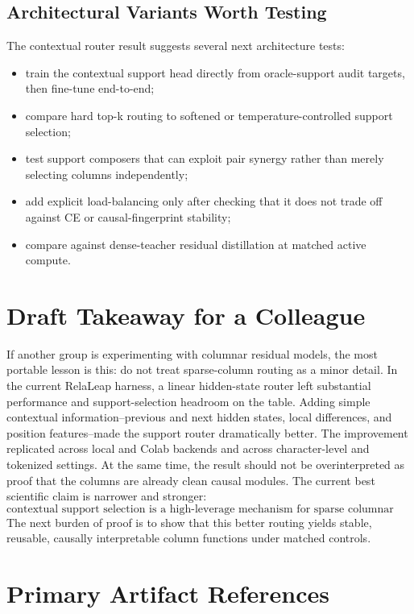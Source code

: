 \documentclass[11pt]{article}
\begin{document}
\subsection{Architectural Variants Worth Testing}

The contextual router result suggests several next architecture tests:
\begin{itemize}
  \item train the contextual support head directly from oracle-support audit
  targets, then fine-tune end-to-end;
  \item compare hard top-k routing to softened or temperature-controlled
  support selection;
  \item test support composers that can exploit pair synergy rather than merely
  selecting columns independently;
  \item add explicit load-balancing only after checking that it does not trade
  off against CE or causal-fingerprint stability;
  \item compare against dense-teacher residual distillation at matched active
  compute.
\end{itemize}

\section{Draft Takeaway for a Colleague}

If another group is experimenting with columnar residual models, the most
portable lesson is this: do not treat sparse-column routing as a minor detail.
In the current RelaLeap harness, a linear hidden-state router left substantial
performance and support-selection headroom on the table. Adding simple
contextual information--previous and next hidden states, local differences, and
position features--made the support router dramatically better. The improvement
replicated across local and Colab backends and across character-level and
tokenized settings. At the same time, the result should not be overinterpreted
as proof that the columns are already clean causal modules. The current best
scientific claim is narrower and stronger:
\[
\boxed{
\text{contextual support selection is a high-leverage mechanism for sparse
columnar residual adapters.}
}
\]
The next burden of proof is to show that this better routing yields stable,
reusable, causally interpretable column functions under matched controls.

\appendix

\section{Primary Artifact References}
\end{document}
